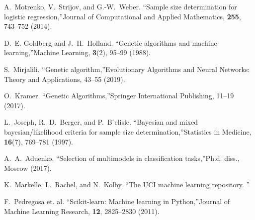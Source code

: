 \documentclass[
11pt,%
tightenlines,%
twoside,%
onecolumn,%
nofloats,%
nobibnotes,%
nofootinbib,%
superscriptaddress,%
noshowpacs,%
centertags]%
{revtex4-2}
\begin{document}
\begin{thebibliography}{99}
A.~Motrenko, V.~Strijov, and G.-W.~Weber. \textquotedblleft Sample size determination for logistic regression,\textquotedblright Journal of Computational and Applied Mathematics, \textbf{255}, 743--752 (2014).

D.~E. Goldberg and J.~H.~Holland. \textquotedblleft Genetic algorithms and machine learning,\textquotedblright Machine Learning, \textbf{3}(2), 95--99 (1988).

S.~Mirjalili. \textquotedblleft Genetic algorithm,\textquotedblright Evolutionary Algorithms and Neural Networks: Theory and Applications, 43--55 (2019).

O.~Kramer. \textquotedblleft Genetic Algorithms,\textquotedblright Springer International Publishing, 11--19 (2017).

L.~Joseph, R.~D.~Berger, and P.~B ́elisle. \textquotedblleft Bayesian and mixed bayesian/likelihood criteria for sample size determination,\textquotedblright Statistics in Medicine, \textbf{16}(7), 769--781 (1997).

A.~A.~Aduenko. \textquotedblleft Selection of multimodels in classification tasks,\textquotedblright Ph.d. diss., Moscow (2017).

K.~Markelle, L.~Rachel, and N.~Kolby. \textquotedblleft The UCI machine learning repository. \textquotedblright

F.~Pedregosa et. al. \textquotedblleft Scikit-learn: Machine learning in Python,\textquotedblright Journal of Machine Learning Research, \textbf{12}, 2825--2830 (2011).

\end{thebibliography}
\end{document}
